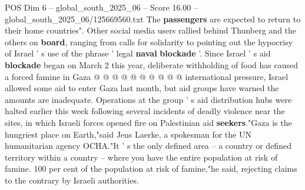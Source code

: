 \begin{textsample}{POS Dim 6 – global\_south\_2025\_06 – Score 16.00 – global\_south\_2025\_06/125669560.txt}
The \textbf{passengers} are expected to return to their home countries".
Other social media users rallied behind Thunberg and the others on \textbf{board}, ranging from calls for solidarity to pointing out the hypocrisy of Israel ' s use of the phrase ' legal \textbf{naval} \textbf{blockade} '.
Since Israel ' s aid \textbf{blockade} began on March 2 this year, deliberate withholding of food has caused a forced famine in Gaza @ @ @ @ @ @ @ @ @ @ international pressure, Israel allowed some aid to enter Gaza last month, but aid groups have warned the amounts are inadequate.
Operations at the group ' s aid distribution hubs were halted earlier this week following several incidents of deadly violence near the sites, in which Israeli forces opened fire on Palestinian aid \textbf{seekers}."Gaza is the hungriest place on Earth,"said Jens Laerke, a spokesman for the UN humanitarian agency OCHA."It ' s the only defined area -- a country or defined territory within a country -- where you have the entire population at risk of famine. 100 per cent of the population at risk of famine,"he said, rejecting claims to the contrary by Israeli authorities.

\end{textsample}
